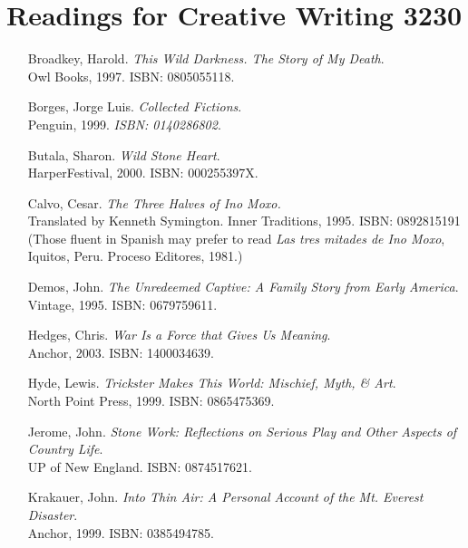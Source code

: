 \documentclass[letterpaper,oneside]{report}
\begin{document}
\section*{Readings for Creative Writing 3230}
\begin{itemize}
\item[Broadkey, Harold.] \textit{This Wild Darkness. The Story of My Death}. \\Owl Books, 1997. \textsc{ISBN: 0805055118}.

\item [Borges, Jorge Luis.] \textit{Collected Fictions}. \\Penguin, 1999. \textsl{ISBN: 0140286802}.

\item [Butala, Sharon.] \textit{Wild Stone Heart}. \\HarperFestival, 2000. \textsc{ISBN: 000255397X}.

\item [Calvo, Cesar.] \textit{The Three Halves of Ino Moxo.} \\Translated by Kenneth Symington. Inner Traditions, 1995. \textsc{ISBN: 0892815191}\\(Those fluent in Spanish may prefer to read \textit{Las tres mitades de Ino Moxo}, Iquitos, Peru. Proceso Editores, 1981.)

\item [Demos, John.] \textit{The Unredeemed Captive: A Family Story from Early America}. \\Vintage, 1995. \textsc{ISBN: 0679759611}.

\item [Hedges, Chris.] \textit{War Is a Force that Gives Us Meaning}. \\Anchor, 2003. \textsc{ISBN: 1400034639}.

\item [Hyde, Lewis.] \textit{Trickster Makes This World: Mischief, Myth, \& Art}. \\North Point Press, 1999. \textsc{ISBN: 0865475369}.

\item [Jerome, John.] \textit{Stone Work: Reflections on Serious Play and Other Aspects of Country Life}. \\UP of New England. \textsc{ISBN: 0874517621}.

\item [Krakauer, John.] \textit{Into Thin Air: A Personal Account of the Mt. Everest Disaster}. \\Anchor, 1999. \textsc{ISBN: 0385494785}.


\end{itemize}
\end{document}
